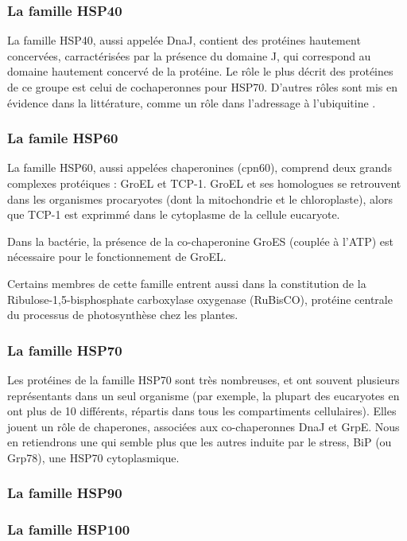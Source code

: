 \subsubsection{La famille HSP40} %
\label{ssub:la_famille_hsp40}

  La famille HSP40, aussi appelée DnaJ, contient des protéines hautement
  concervées, carractérisées par la présence du domaine J, qui correspond au
  domaine hautement concervé de la protéine. Le rôle le plus décrit des
  protéines de ce groupe est celui de cochaperonnes pour HSP70. D'autres rôles
  sont mis en évidence dans la littérature, comme un rôle dans l'adressage à
  l'ubiquitine \cite{lee1996}.

\subsubsection{La famile HSP60} %
\label{ssub:la_famile_hsp60}

La famille HSP60, aussi appelées chaperonines (cpn60), comprend deux grands
complexes protéiques : GroEL et TCP-1. GroEL et ses homologues se retrouvent
dans les organismes procaryotes (dont la mitochondrie et le chloroplaste),
alors que TCP-1 est exprimmé dans le cytoplasme de la cellule eucaryote.

Dans la bactérie, la présence de la co-chaperonine GroES (couplée à l'ATP) est
nécessaire pour le fonctionnement de GroEL.

Certains membres de cette famille entrent aussi dans la constitution de la
Ribulose-1,5-bisphosphate carboxylase oxygenase (RuBisCO), protéine centrale
du processus de photosynthèse chez les plantes.

\subsubsection{La famille HSP70} %
\label{ssub:la_famille_hsp70}

Les protéines de la famille HSP70 sont très nombreuses, et ont souvent
plusieurs représentants dans un seul organisme (par exemple, la plupart des
eucaryotes en ont plus de 10 différents, répartis dans tous les compartiments
cellulaires). Elles jouent un rôle de chaperones, associées aux co-chaperonnes
DnaJ et GrpE. Nous en retiendrons une qui semble plus que les autres induite
par le stress, BiP (ou Grp78), une HSP70 cytoplasmique.

\subsubsection{La famille HSP90} %
\label{ssub:la_famille_hsp90}

\subsubsection{La famille HSP100} %
\label{ssub:la_famille_hsp100}



